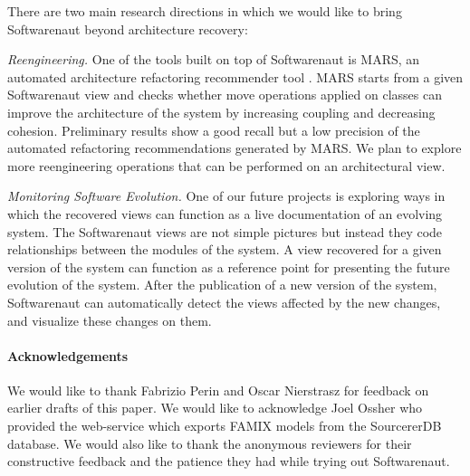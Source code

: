 \documentclass[preprint,12pt]{elsarticle}
\begin{document}
There are two main research directions in which we would like to bring Softwarenaut beyond architecture recovery:

\begin{description}

\item {\em Reengineering.} One of the tools built on top of Softwarenaut is MARS, an automated architecture refactoring recommender tool \cite{boeckmann-mars}. MARS starts from a given Softwarenaut view and checks whether move operations applied on classes can improve the architecture of the system by increasing coupling and decreasing cohesion. Preliminary results show a good recall but a low precision of the automated refactoring recommendations generated by MARS. We plan to explore more reengineering operations that can be performed on an architectural view.

\item {\em Monitoring Software Evolution.} One of our future projects is exploring ways in which the recovered views can function as a live documentation of an evolving system. The Softwarenaut views are not simple pictures but instead they code relationships between the modules of the system. A view recovered for a given version of the system can function as a reference point for presenting the future evolution of the system. After the publication of a new version of the system, Softwarenaut can automatically detect the views affected by the new changes, and visualize these changes on them.

\end{description}

\paragraph{Acknowledgements} We would like to thank Fabrizio Perin and Oscar Nierstrasz for feedback on earlier drafts of this paper. We would like to acknowledge Joel Ossher who provided the web-service which exports FAMIX models from the SourcererDB database. We would also like to thank the anonymous reviewers for their constructive feedback and the patience they had while trying out Softwarenaut.



\end{document}
